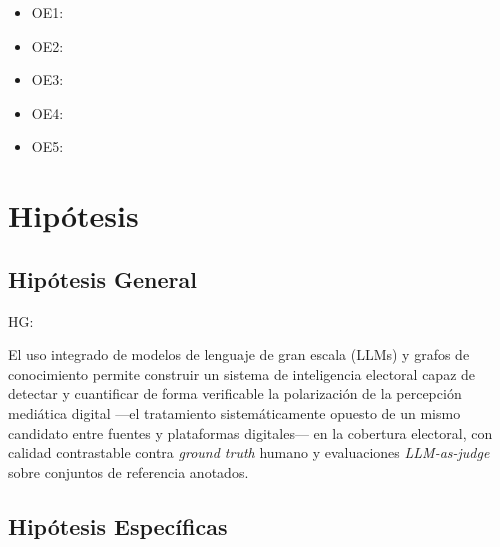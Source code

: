 \begin{itemize}
	\item OE1: {\Objone}
	\item OE2: {\Objtwo}
	\item OE3: {\Objthree}
	\item OE4: {\Objfour}
	\item OE5: {\Objfive}
\end{itemize}

\section{Hipótesis}

\subsection{Hipótesis General}
HG: \newcommand{\HipotesisGeneral}{
 El uso integrado de modelos de lenguaje de gran escala (LLMs) y grafos de conocimiento permite construir un sistema de inteligencia electoral capaz de detectar y cuantificar de forma verificable la polarización de la percepción mediática digital —el tratamiento sistemáticamente opuesto de un mismo candidato entre fuentes y plataformas digitales— en la cobertura electoral, con calidad contrastable contra \textit{ground truth} humano y evaluaciones \textit{LLM-as-judge} sobre conjuntos de referencia anotados.
}
\HipotesisGeneral
\subsection{Hipótesis Específicas}

